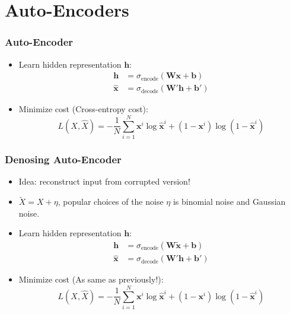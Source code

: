 \documentclass{beamer}
\begin{document}
\section{Auto-Encoders}

\begin{frame}
  \frametitle{Auto-Encoder}

  \begin{itemize}
    \item[\dsheraldical] Learn hidden representation $\mathbf{h}$:
      \begin{align*}
        \mathbf{h}&=\sigma_{\text{encode}}(\mathbf{W}\mathbf{x}+\mathbf{b}) \\
        \hat{\mathbf{x}}&=\sigma_{\text{decode}}(\mathbf{W}'\mathbf{h}+\mathbf{b}')
      \end{align*}
    \item[\dsheraldical] Minimize cost (Cross-entropy cost):
      \begin{equation*}
          L(X, \hat{X})=-\frac{1}{N}\sum_{i=1}^{N}\mathbf{x}^{i}\log \hat{\mathbf{x}}^{i}+(1-\mathbf{x}^{i})\log(1-\hat{\mathbf{x}}^{i})
      \end{equation*}
  \end{itemize}
\end{frame}

\begin{frame}
  \frametitle{Denosing Auto-Encoder}
  \begin{itemize}
    \item[\dsheraldical] Idea: reconstruct input from corrupted version!
    \item[\dsheraldical] $\tilde{X}=X+\eta$, popular choices of the noise $\eta$ is binomial noise and Gaussian noise.
    \item[\dsheraldical] Learn hidden representation $\mathbf{h}$:
      \begin{align*}
        \mathbf{h}&=\sigma_{\text{encode}}(\mathbf{W}\tilde{\mathbf{x}}+\mathbf{b}) \\
        \hat{\mathbf{x}}&=\sigma_{\text{decode}}(\mathbf{W}'\mathbf{h}+\mathbf{b}')
      \end{align*}

    \item[\dsheraldical] Minimize cost (As same as previously!):
      \begin{equation*}
          L(X, \hat{X})=-\frac{1}{N}\sum_{i=1}^{N}\mathbf{x}^{i}\log \hat{\mathbf{x}}^{i}+(1-\mathbf{x}^{i})\log(1-\hat{\mathbf{x}}^{i})
      \end{equation*}
  \end{itemize}
\end{frame}
\end{document}
